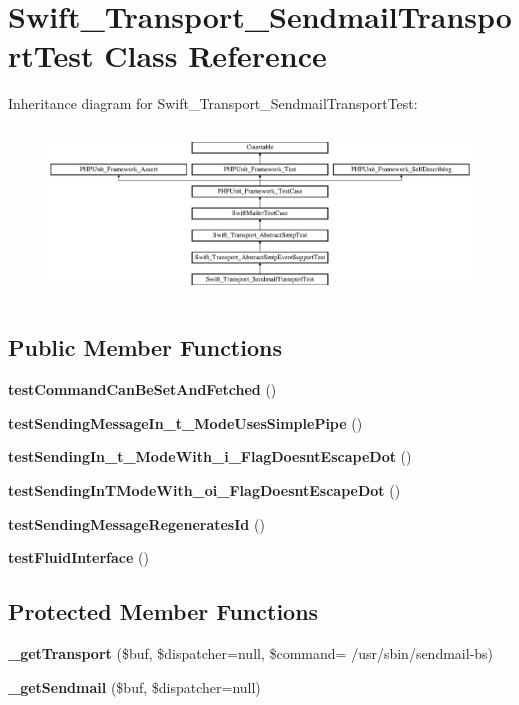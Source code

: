 \section{Swift\+\_\+\+Transport\+\_\+\+Sendmail\+Transport\+Test Class Reference}
\label{class_swift___transport___sendmail_transport_test}
Inheritance diagram for Swift\+\_\+\+Transport\+\_\+\+Sendmail\+Transport\+Test\+:\begin{figure}[H]
\begin{center}
\leavevmode
\includegraphics[height=4.537037cm]{class_swift___transport___sendmail_transport_test}
\end{center}
\end{figure}
\subsection*{Public Member Functions}
\begin{DoxyCompactItemize}
\item 
{\bf test\+Command\+Can\+Be\+Set\+And\+Fetched} ()
\item 
{\bf test\+Sending\+Message\+In\+\_\+t\+\_\+\+Mode\+Uses\+Simple\+Pipe} ()
\item 
{\bf test\+Sending\+In\+\_\+t\+\_\+\+Mode\+With\+\_\+i\+\_\+\+Flag\+Doesnt\+Escape\+Dot} ()
\item 
{\bf test\+Sending\+In\+T\+Mode\+With\+\_\+oi\+\_\+\+Flag\+Doesnt\+Escape\+Dot} ()
\item 
{\bf test\+Sending\+Message\+Regenerates\+Id} ()
\item 
{\bf test\+Fluid\+Interface} ()
\end{DoxyCompactItemize}
\subsection*{Protected Member Functions}
\begin{DoxyCompactItemize}
\item 
{\bf \+\_\+get\+Transport} (\$buf, \$dispatcher=null, \$command= \textquotesingle{}/usr/sbin/sendmail-\/bs\textquotesingle{})
\item 
{\bf \+\_\+get\+Sendmail} (\$buf, \$dispatcher=null)
\end{DoxyCompactItemize}
